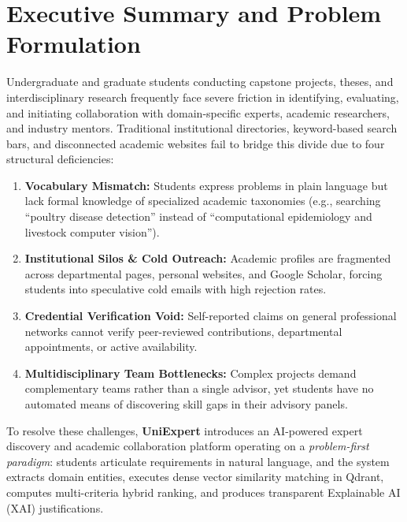 \documentclass[11pt,a4paper]{article}
\begin{document}
\thispagestyle{plain}

\section{Executive Summary and Problem Formulation}

Undergraduate and graduate students conducting capstone projects, theses, and interdisciplinary research frequently face severe friction in identifying, evaluating, and initiating collaboration with domain-specific experts, academic researchers, and industry mentors. Traditional institutional directories, keyword-based search bars, and disconnected academic websites fail to bridge this divide due to four structural deficiencies:
\begin{enumerate}[label=\textbf{(\arabic*)},noitemsep]
    \item \textbf{Vocabulary Mismatch:} Students express problems in plain language but lack formal knowledge of specialized academic taxonomies (e.g., searching ``poultry disease detection'' instead of ``computational epidemiology and livestock computer vision'').
    \item \textbf{Institutional Silos \& Cold Outreach:} Academic profiles are fragmented across departmental pages, personal websites, and Google Scholar, forcing students into speculative cold emails with high rejection rates.
    \item \textbf{Credential Verification Void:} Self-reported claims on general professional networks cannot verify peer-reviewed contributions, departmental appointments, or active availability.
    \item \textbf{Multidisciplinary Team Bottlenecks:} Complex projects demand complementary teams rather than a single advisor, yet students have no automated means of discovering skill gaps in their advisory panels.
\end{enumerate}

To resolve these challenges, \textbf{UniExpert} introduces an AI-powered expert discovery and academic collaboration platform operating on a \textit{problem-first paradigm}: students articulate requirements in natural language, and the system extracts domain entities, executes dense vector similarity matching in Qdrant, computes multi-criteria hybrid ranking, and produces transparent Explainable AI (XAI) justifications.
\end{document}
